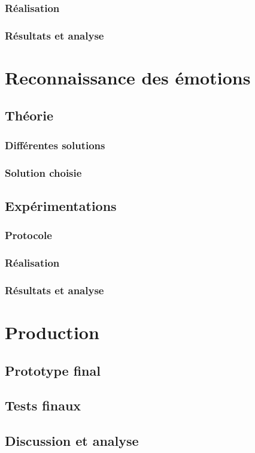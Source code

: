 \documentclass{report}
\begin{document}
			\section{R\'ealisation}
			\section{R\'esultats et analyse}
	\part{Reconnaissance des \'emotions}
		\chapter{Th\'eorie}
			\section{Diff\'erentes solutions}
			\section{Solution choisie}
		\chapter{Exp\'erimentations}
			\section{Protocole}
			\section{R\'ealisation}
			\section{R\'esultats et analyse}
	\part{Production}
		\chapter{Prototype final}
		\chapter{Tests finaux}
		\chapter{Discussion et analyse}
\end{document}
